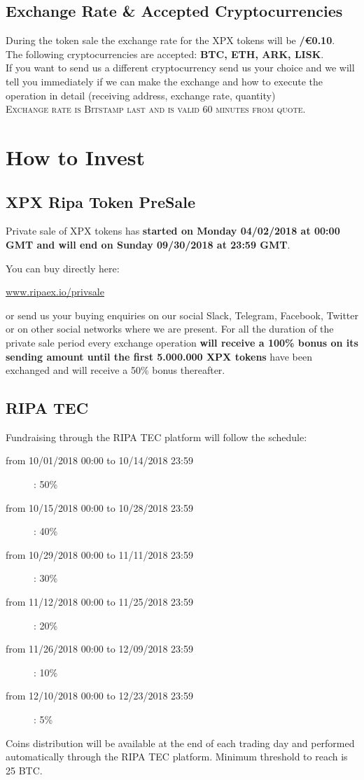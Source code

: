 \documentclass[11pt,fleqn,oneside]{book} %
\begin{document}
\subsection{Exchange Rate \& Accepted Cryptocurrencies}
During the token sale the exchange rate for the XPX tokens will be \textbf{\PHP/\euro0.10}.\\

The following cryptocurrencies are accepted: \textbf{BTC, ETH, ARK, LISK}.\\

If you want to send us a different cryptocurrency send us your choice and we will tell you immediately if we can make 
the exchange and how to execute the operation in detail (receiving address, exchange rate, quantity)\\

\textsc{Exchange rate is Bitstamp last and is valid 60 minutes from quote}.

\section{How to Invest}
\subsection{XPX Ripa Token PreSale}
Private sale of XPX tokens has \textbf{started on Monday 04/02/2018 at 00:00 GMT and will end on Sunday 09/30/2018 at 23:59 GMT}.

You can buy directly here: 
\begin{center}
	\href{https://www.ripaex.io/privsale}{www.ripaex.io/privsale}
\end{center}

or send us your buying enquiries on our social Slack, Telegram, Facebook, Twitter or on other social networks where we are present.
For all the duration of the private sale period every exchange operation \textbf{will receive a 100\% bonus on its sending amount
until the first 5.000.000 XPX tokens} have been exchanged and will receive a 50\% bonus thereafter.

\subsection{RIPA TEC}
Fundraising through the RIPA TEC platform will follow the schedule:
\begin{description}
	\item[from 10/01/2018 00:00 to 10/14/2018 23:59]: 50\% 
	\item[from 10/15/2018 00:00 to 10/28/2018 23:59]: 40\% 
	\item[from 10/29/2018 00:00 to 11/11/2018 23:59]: 30\% 
	\item[from 11/12/2018 00:00 to 11/25/2018 23:59]: 20\% 
	\item[from 11/26/2018 00:00 to 12/09/2018 23:59]: 10\% 
	\item[from 12/10/2018 00:00 to 12/23/2018 23:59]: 5\% 
\end{description}
Coins distribution will be available at the end of each trading day and performed automatically through the RIPA TEC platform. Minimum
threshold to reach is 25 BTC.\\
\end{document}

